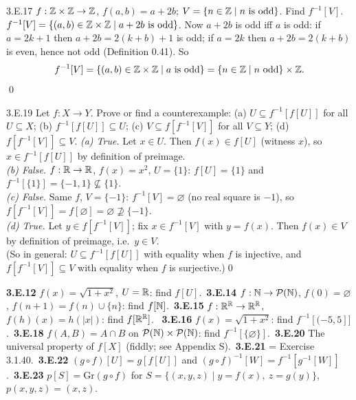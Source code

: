 \begin{bookex}[essential]{3.E.17}
$f:\mathbb{Z}\times\mathbb{Z}\to\mathbb{Z}$, $f(a,b)=a+2b$; $V=\{n\in\mathbb{Z}\mid n\text{ is odd}\}$. Find $f^{-1}[V]$.
\solution
$f^{-1}[V]=\{(a,b)\in\mathbb{Z}\times\mathbb{Z}\mid a+2b\text{ is odd}\}$. Now $a+2b$ is odd iff $a$ is odd: if $a=2k+1$ then $a+2b=2(k+b)+1$ is odd; if $a=2k$ then $a+2b=2(k+b)$ is even, hence not odd (Definition 0.41). So
\[
f^{-1}[V]=\{(a,b)\in\mathbb{Z}\times\mathbb{Z}\mid a\text{ is odd}\}=\{n\in\mathbb{Z}\mid n\text{ odd}\}\times\mathbb{Z} .
\]\qed
\end{bookex}

\begin{bookex}[essential]{3.E.19}
Let $f:X\to Y$. Prove or find a counterexample: (a) $U\subseteq f^{-1}[f[U]]$ for all $U\subseteq X$; (b) $f^{-1}[f[U]]\subseteq U$; (c) $V\subseteq f[f^{-1}[V]]$ for all $V\subseteq Y$; (d) $f[f^{-1}[V]]\subseteq V$.
\solution
\emph{(a) True.} Let $x\in U$. Then $f(x)\in f[U]$ (witness $x$), so $x\in f^{-1}[f[U]]$ by definition of preimage.\\
\emph{(b) False.} $f:\mathbb{R}\to\mathbb{R}$, $f(x)=x^2$, $U=\{1\}$: $f[U]=\{1\}$ and $f^{-1}[\{1\}]=\{-1,1\}\nsubseteq\{1\}$.\\
\emph{(c) False.} Same $f$, $V=\{-1\}$: $f^{-1}[V]=\varnothing$ (no real square is $-1$), so $f[f^{-1}[V]]=f[\varnothing]=\varnothing\nsupseteq\{-1\}$.\\
\emph{(d) True.} Let $y\in f[f^{-1}[V]]$; fix $x\in f^{-1}[V]$ with $y=f(x)$. Then $f(x)\in V$ by definition of preimage, i.e.\ $y\in V$.\\
(So in general: $U\subseteq f^{-1}[f[U]]$ with equality when $f$ is injective, and $f[f^{-1}[V]]\subseteq V$ with equality when $f$ is surjective.)\qed
\end{bookex}

\begin{trybox}[{3.E.12, 3.E.14--3.E.16, 3.E.18, 3.E.20--3.E.23 \fO}]
\textbf{3.E.12} $f(x)=\sqrt{1+x^2}$, $U=\mathbb{R}$: find $f[U]$.\ \textbf{3.E.14} $f:\mathbb{N}\to\mathcal{P}(\mathbb{N})$, $f(0)=\varnothing$, $f(n+1)=f(n)\cup\{n\}$: find $f[\mathbb{N}]$.\ \textbf{3.E.15} $f:\mathbb{R}^{\mathbb{R}}\to\mathbb{R}^{\mathbb{R}}$, $f(h)(x)=h(|x|)$: find $f[\mathbb{R}^{\mathbb{R}}]$. \ \textbf{3.E.16} $f(x)=\sqrt{1+x^2}$: find $f^{-1}[(-5,5]]$.\ \textbf{3.E.18} $f(A,B)=A\cap B$ on $\mathcal{P}(\mathbb{N})\times\mathcal{P}(\mathbb{N})$: find $f^{-1}[\{\varnothing\}]$.\ \textbf{3.E.20} The universal property of $f[X]$ (fiddly; see Appendix S).\ \textbf{3.E.21} = Exercise 3.1.40.\ \textbf{3.E.22} $(g\circ f)[U]=g[f[U]]$ and $(g\circ f)^{-1}[W]=f^{-1}[g^{-1}[W]]$.\ \textbf{3.E.23} $p[S]=\mathrm{Gr}(g\circ f)$ for $S=\{(x,y,z)\mid y=f(x),\ z=g(y)\}$, $p(x,y,z)=(x,z)$.
\end{trybox}

